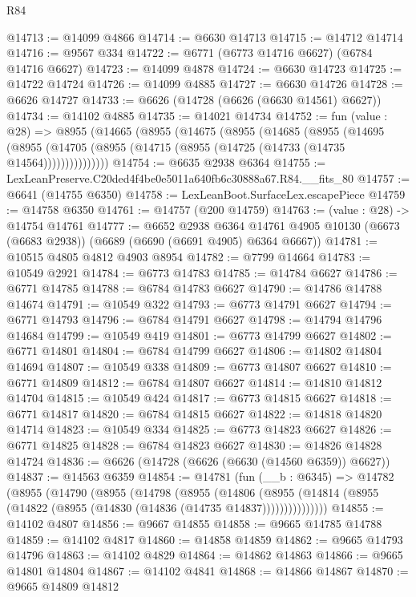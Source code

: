 \begin{lexlean}{R84}
\begin{coremodule}
@14713 := @14099 @4866
@14714 := @6630 @14713
@14715 := @14712 @14714
@14716 := @9567 @334
@14722 := @6771 (@6773 @14716 @6627) (@6784 @14716 @6627)
@14723 := @14099 @4878
@14724 := @6630 @14723
@14725 := @14722 @14724
@14726 := @14099 @4885
@14727 := @6630 @14726
@14728 := @6626 @14727
@14733 := @6626 (@14728 (@6626 (@6630 @14561) @6627))
@14734 := @14102 @4885
@14735 := @14021 @14734
@14752 := fun (value : @28) =>
  @8955
    (@14665
      (@8955
        (@14675
          (@8955
            (@14685
              (@8955
                (@14695
                  (@8955 (@14705 (@8955 (@14715 (@8955 (@14725 (@14733 (@14735 @14564)))))))))))))))
@14754 := @6635 @2938 @6364
@14755 := LexLeanPreserve.C20ded4f4be0e5011a640fb6c30888a67.R84.__fits_80
@14757 := @6641 (@14755 @6350)
@14758 := LexLeanBoot.SurfaceLex.escapePiece
@14759 := @14758 @6350
@14761 := @14757 (@200 @14759)
@14763 := (value : @28) -> @14754 @14761
@14777 := @6652
    @2938
    @6364
    @14761
    @4905
    @10130
    (@6673 (@6683 @2938))
    (@6689 (@6690 (@6691 @4905) @6364 @6667))
@14781 := @10515 @4805 @4812 @4903 @8954
@14782 := @7799 @14664
@14783 := @10549 @2921
@14784 := @6773 @14783
@14785 := @14784 @6627
@14786 := @6771 @14785
@14788 := @6784 @14783 @6627
@14790 := @14786 @14788 @14674
@14791 := @10549 @322
@14793 := @6773 @14791 @6627
@14794 := @6771 @14793
@14796 := @6784 @14791 @6627
@14798 := @14794 @14796 @14684
@14799 := @10549 @419
@14801 := @6773 @14799 @6627
@14802 := @6771 @14801
@14804 := @6784 @14799 @6627
@14806 := @14802 @14804 @14694
@14807 := @10549 @338
@14809 := @6773 @14807 @6627
@14810 := @6771 @14809
@14812 := @6784 @14807 @6627
@14814 := @14810 @14812 @14704
@14815 := @10549 @424
@14817 := @6773 @14815 @6627
@14818 := @6771 @14817
@14820 := @6784 @14815 @6627
@14822 := @14818 @14820 @14714
@14823 := @10549 @334
@14825 := @6773 @14823 @6627
@14826 := @6771 @14825
@14828 := @6784 @14823 @6627
@14830 := @14826 @14828 @14724
@14836 := @6626 (@14728 (@6626 (@6630 (@14560 @6359)) @6627))
@14837 := @14563 @6359
@14854 := @14781
    (fun (__b : @6345) =>
    @14782
      (@8955
        (@14790
          (@8955
            (@14798
              (@8955
                (@14806
                  (@8955 (@14814 (@8955 (@14822 (@8955 (@14830 (@14836 (@14735 @14837)))))))))))))))
@14855 := @14102 @4807
@14856 := @9667 @14855
@14858 := @9665 @14785 @14788
@14859 := @14102 @4817
@14860 := @14858 @14859
@14862 := @9665 @14793 @14796
@14863 := @14102 @4829
@14864 := @14862 @14863
@14866 := @9665 @14801 @14804
@14867 := @14102 @4841
@14868 := @14866 @14867
@14870 := @9665 @14809 @14812

\end{coremodule}
\end{lexlean}

